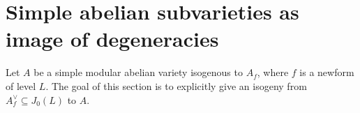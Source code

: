 

\section{Simple abelian subvarieties as image of degeneracies}

Let $A$ be a simple modular abelian variety isogenous to $A_f$, where $f$ is a
newform of level $L$. The goal of this section is to explicitly give an isogeny
from $A_f ^\vee\subseteq J_0(L)$ to $A$. 


